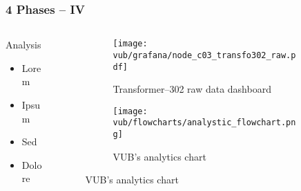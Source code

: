 \begin{frame}
    \frametitle{4 Phases -- IV}
    \vspace*{\fill}
    \begin{columns}[onlytextwidth, c]
        \begin{column}{.47\textwidth}
            \begin{exampleblock}{Analysis}
                \begin{itemize}
                    \item Lorem
                    \item Ipsum
                    \item Sed 
                    \item Dolore
                \end{itemize}
            \end{exampleblock}
        \end{column}
        \begin{column}{.52\textwidth}
            \begin{figure}[ht]
                \begin{subfigure}{\textwidth}
                    \centering
                    \texttt{[image: vub/grafana/node\_c03\_transfo302\_raw.pdf]}
                    \caption{Transformer--302 raw data dashboard}
                \end{subfigure}
                \begin{subfigure}{\textwidth}
                    \centering
                    \texttt{[image: vub/flowcharts/analystic\_flowchart.png]}
                    \caption{\acs{VUB}'s analytics chart}
                \end{subfigure}
            \end{figure}
        \end{column}
    \end{columns}
    \vspace*{\fill}
\end{frame}


